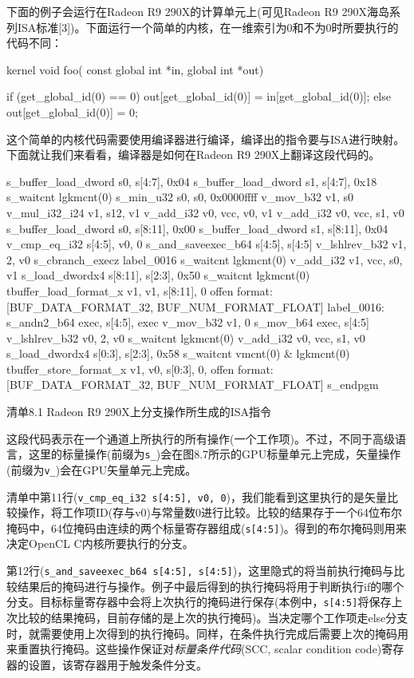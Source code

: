 下面的例子会运行在Radeon R9 290X的计算单元上(可见Radeon R9 290X海岛系列ISA标准[3])。下面运行一个简单的内核，在一维索引为0和不为0时所要执行的代码不同：

\begin{codebox}[cpp]
kernel void foo(
  const global int *in,
  global int *out){

  if (get_global_id(0) == 0){
    out[get_global_id(0)] = in[get_global_id(0)];
  } else {
    out[get_global_id(0)] = 0;
  }
}
\end{codebox}

这个简单的内核代码需要使用编译器进行编译，编译出的指令要与ISA进行映射。下面就让我们来看看，编译器是如何在Radeon R9 290X上翻译这段代码的。

\begin{codebox}[text]
s_buffer_load_dword s0, s[4:7], 0x04
s_buffer_load_dword s1, s[4:7], 0x18
s_waitcnt lgkmcnt(0)
s_min_u32 s0, s0, 0x0000ffff
v_mov_b32 v1, s0
v_mul_i32_i24 v1, s12, v1
v_add_i32 v0, vcc, v0, v1
v_add_i32 v0, vcc, s1, v0
s_buffer_load_dword s0, s[8:11], 0x00
s_buffer_load_dword s1, s[8:11], 0x04
v_cmp_eq_i32 s[4:5], v0, 0
s_and_saveexec_b64 s[4:5], s[4:5]
v_lshlrev_b32 v1, 2, v0
s_cbranch_execz label_0016
s_waitcnt lgkmcnt(0)
v_add_i32 v1, vcc, s0, v1
s_load_dwordx4 s[8:11], s[2:3], 0x50
s_waitcnt lgkmcnt(0)
tbuffer_load_format_x v1, v1, s[8:11], 0 offen
    format:[BUF_DATA_FORMAT_32, BUF_NUM_FORMAT_FLOAT]
label_0016:
s_andn2_b64 exec, s[4:5], exec
v_mov_b32 v1, 0
s_mov_b64 exec, s[4:5]
v_lshlrev_b32 v0, 2, v0
s_waitcnt lgkmcnt(0)
v_add_i32 v0, vcc, s1, v0
s_load_dwordx4 s[0:3], s[2:3], 0x58
s_waitcnt vmcnt(0) & lgkmcnt(0)
tbuffer_store_format_x v1, v0, s[0:3], 0, offen
    format:[BUF_DATA_FORMAT_32, BUF_NUM_FORMAT_FLOAT]
s_endpgm
\end{codebox}

清单8.1 Radeon R9 290X上分支操作所生成的ISA指令

这段代码表示在一个通道上所执行的所有操作(一个工作项)。不过，不同于高级语言，这里的标量操作(前缀为\texttt{s\_})会在图8.7所示的GPU标量单元上完成，矢量操作(前缀为\texttt{v\_})会在GPU矢量单元上完成。

清单中第11行(\texttt{v\_cmp\_eq\_i32 s[4:5], v0, 0})，我们能看到这里执行的是矢量比较操作，将工作项ID(存与v0)与常量数0进行比较。比较的结果存于一个64位布尔掩码中，64位掩码由连续的两个标量寄存器组成(\texttt{s[4:5]})。得到的布尔掩码则用来决定OpenCL C内核所要执行的分支。

第12行(\texttt{s\_and\_saveexec\_b64 s[4:5], s[4:5]})，这里隐式的将当前执行掩码与比较结果后的掩码进行与操作。例子中最后得到的执行掩码将用于判断执行if的哪个分支。目标标量寄存器中会将上次执行的掩码进行保存(本例中，\texttt{s[4:5]}将保存上次比较的结果掩码，目前存储的是上次的执行掩码)。当决定哪个工作项走else分支时，就需要使用上次得到的执行掩码。同样，在条件执行完成后需要上次的掩码用来重置执行掩码。这些操作保证对\emph{标量条件代码}(SCC, scalar condition code)寄存器的设置，该寄存器用于触发条件分支。

